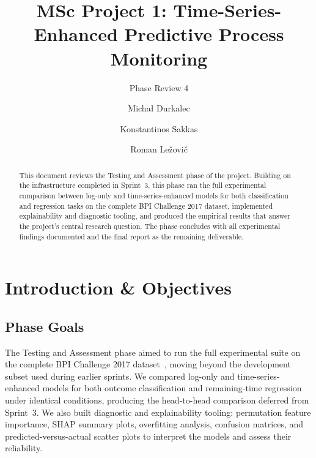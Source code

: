 \documentclass[runningheads]{llncs}
\begin{document}
\title{MSc Project 1: Time-Series-Enhanced Predictive Process Monitoring}
\subtitle{Phase Review 4}
\author{Micha\l{} Durkalec \and
    Konstantinos Sakkas \and
    Roman Le\v{z}ovi\v{c}
}
\maketitle
\begin{abstract}
    This document reviews the Testing and Assessment phase of the project. Building on the
    infrastructure completed in Sprint~3, this phase ran the full experimental comparison
    between log-only and time-series-enhanced models for both classification and regression
    tasks on the complete BPI Challenge 2017 dataset, implemented explainability and
    diagnostic tooling, and produced the empirical results that answer the project's
    central research question. The phase concludes with all experimental findings
    documented and the final report as the remaining deliverable.
\end{abstract}

\section{Introduction \& Objectives}

\subsection{Phase Goals}
The Testing and Assessment phase aimed to run the full experimental suite on the complete
BPI Challenge 2017 dataset~\cite{bpic2017}, moving beyond the development subset used
during earlier sprints. We compared log-only and time-series-enhanced models for both
outcome classification and remaining-time regression under identical conditions,
producing the head-to-head comparison deferred from Sprint~3. We also built diagnostic
and explainability tooling: permutation feature importance, SHAP summary plots,
overfitting analysis, confusion matrices, and predicted-versus-actual scatter plots to
interpret the models and assess their reliability.
\end{document}
